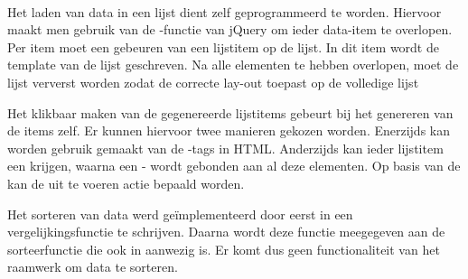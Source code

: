 \begin{table}[H]
\centering
{}
\caption{Gebruik van  voor \st{}~(\sta), \kendo{}~(\kendoa), \jqm{}~(\jqma) en \lungo{}~(\lungoa).}
\label{tabel:evaluatie-gebruik-lijsten}
\end{table}

\paragraph{\jqm}
Het laden van data in een lijst dient zelf geprogrammeerd te worden.
Hiervoor maakt men gebruik van de -functie van jQuery om ieder data-item te overlopen.
Per item moet een  gebeuren van een lijstitem op de lijst.
In dit item wordt de template van de lijst geschreven.
Na alle elementen te hebben overlopen, moet de lijst ververst worden zodat \jqm{} de correcte lay-out toepast op de volledige lijst

Het klikbaar maken van de gegenereerde lijstitems gebeurt bij het genereren van de items zelf.
Er kunnen hiervoor twee manieren gekozen worden.
Enerzijds kan worden gebruik gemaakt van de -tags in HTML.
Anderzijds kan ieder lijstitem een  krijgen, waarna een -  wordt gebonden aan al deze elementen.
Op basis van de  kan de uit te voeren actie bepaald worden.

Het sorteren van data werd geïmplementeerd door eerst in \js{} een vergelijkingsfunctie te schrijven.
Daarna wordt deze functie meegegeven aan de sorteerfunctie die ook in \js{} aanwezig is.
Er komt dus geen functionaliteit van het raamwerk om data te sorteren.

